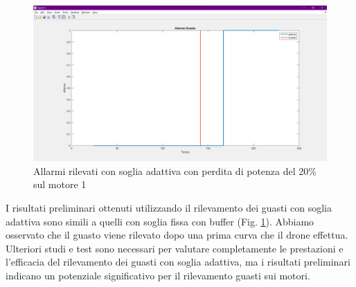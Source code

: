 \begin{figure}[H]
    \centering
    \includegraphics[width=\textwidth]{files/images/allarmi_soglia_adattiva.png}
    \caption{Allarmi rilevati con soglia adattiva con perdita di potenza del 20\% sul motore 1}
    \label{Allarmi soglia adattiva}
\end{figure}
\noindent
I risultati preliminari ottenuti utilizzando il rilevamento dei guasti con soglia adattiva sono simili a quelli con soglia fissa con buffer (Fig. \ref{Allarmi soglia adattiva}). Abbiamo osservato che il guasto viene rilevato dopo una prima curva che il drone effettua.
\\
Ulteriori studi e test sono necessari per valutare completamente le prestazioni e l'efficacia del rilevamento dei guasti con soglia adattiva, ma i risultati preliminari indicano un potenziale significativo per il rilevamento guasti sui motori.
